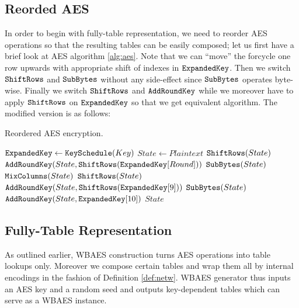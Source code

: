 
\subsection{Reorded AES}

In order to begin with fully-table representation, we need to reorder AES operations so that the resulting tables can be easily composed; let us first have a brief look at AES algorithm \ref{alg:aes}. Note that we can ``move'' the forcycle one row upwards with appropriate shift of indexes in $\texttt{ExpandedKey}$. Then we switch $\texttt{ShiftRows}$ and $\texttt{SubBytes}$ without any side-effect since $\texttt{SubBytes}$ operates byte-wise. Finally we switch $\texttt{ShiftRows}$ and $\texttt{AddRoundKey}$ while we moreover have to apply $\texttt{ShiftRows}$ on $\texttt{ExpandedKey}$ so that we get equivalent algorithm. The modified version is as follows:
\begin{alg}
\label{alg:reordaes}
	Reordered AES encryption.
	\begin{algorithmic}[1]
			\State $\texttt{ExpandedKey} \gets \texttt{KeySchedule}(Key)$
			\State $State \gets Plaintext$
				\State $\texttt{ShiftRows}(State)$
				\State $\texttt{AddRoundKey}(State, \texttt{ShiftRows}(\texttt{ExpandedKey}[Round]))$
				\State $\texttt{SubBytes}(State)$
				\State $\texttt{MixColumns}(State)$
			\EndFor
			\State $\texttt{ShiftRows}(State)$
			\State $\texttt{AddRoundKey}(State, \texttt{ShiftRows}(\texttt{ExpandedKey}[9]))$
			\State $\texttt{SubBytes}(State)$
			\State $\texttt{AddRoundKey}(State, \texttt{ExpandedKey}[10])$
			\State\Return $State$
		\EndFunction
	\end{algorithmic}
\end{alg}



\subsection{Fully-Table Representation}

As outlined earlier, WBAES construction turns AES operations into table lookups only. Moreover we compose certain tables and wrap them all by internal encodings in the fashion of Definition \ref{def:netw}. WBAES generator thus inputs an AES key and a random seed and outputs key-dependent tables which can serve as a WBAES instance.

